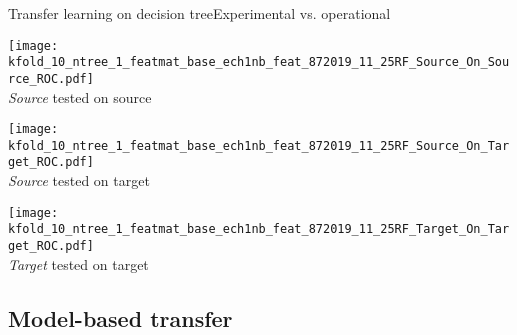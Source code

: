 \begin{frame}{Transfer learning on decision tree}{Experimental vs. operational}
\renewcommand{\ratio}{0.32}
\begin{minipage}[t]{\linewidth}
    \centering
    \begin{minipage}[t]{\ratio\linewidth}
        \centering
        \texttt{[image: kfold\_10\_ntree\_1\_featmat\_base\_ech1nb\_feat\_872019\_11\_25RF\_Source\_On\_Source\_ROC.pdf]}\\
        {\small \emph{Source} tested on source}
    \end{minipage}
    \begin{minipage}[t]{\ratio\linewidth}
        \centering
        \texttt{[image: kfold\_10\_ntree\_1\_featmat\_base\_ech1nb\_feat\_872019\_11\_25RF\_Source\_On\_Target\_ROC.pdf]}\\
        {\small \emph{Source} tested on target}
    \end{minipage}
    \begin{minipage}[t]{\ratio\linewidth}
        \centering
        \texttt{[image: kfold\_10\_ntree\_1\_featmat\_base\_ech1nb\_feat\_872019\_11\_25RF\_Target\_On\_Target\_ROC.pdf]}\\
        {\small \emph{Target} tested on target}
    \end{minipage}
\end{minipage}

\end{frame}

\subsection{Model-based transfer}

